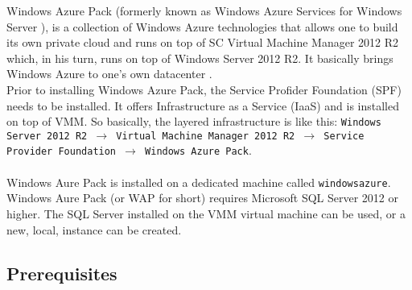Windows Azure Pack (formerly known as Windows Azure Services for Windows Server \citep{WAP1}), is a collection of Windows Azure technologies that allows one to build its own private cloud and runs on top of SC Virtual Machine Manager 2012 R2 which, in his turn, runs on top of Windows Server 2012 R2. It basically brings Windows Azure to one's own datacenter \citep{WAP2, WAP3}. \\
Prior to installing Windows Azure Pack, the Service Profider Foundation (SPF) needs to be installed. It offers Infrastructure as a Service (IaaS) and is installed on top of VMM. So basically, the layered infrastructure is like this: \texttt{Windows Server 2012 R2 $\rightarrow$ Virtual Machine Manager 2012 R2  $\rightarrow$ Service Provider Foundation  $\rightarrow$  Windows Azure Pack}. \\ \\
Windows Aure Pack is installed on a dedicated machine called \texttt{windowsazure}. Windows Aure Pack (or WAP for short) requires Microsoft SQL Server 2012 or higher. The SQL Server installed on the VMM virtual machine can be used, or a new, local, instance can be created.

\subsection{Prerequisites}

